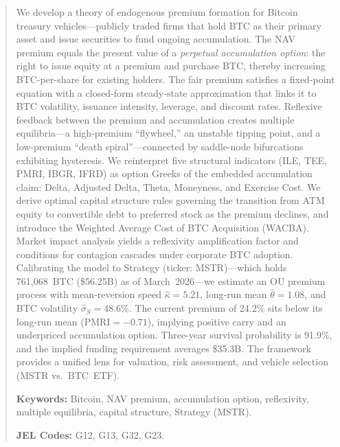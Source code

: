 
\begin{abstract}
We develop a theory of endogenous premium formation for Bitcoin treasury
vehicles---publicly traded firms that hold BTC as their primary asset and
issue securities to fund ongoing accumulation.  The NAV premium equals the
present value of a \emph{perpetual accumulation option}: the right to issue
equity at a premium and purchase BTC, thereby increasing BTC-per-share for
existing holders.  The fair premium satisfies a fixed-point equation with a
closed-form steady-state approximation that links it to BTC volatility,
issuance intensity, leverage, and discount rates.  Reflexive feedback between
the premium and accumulation creates multiple equilibria---a high-premium
``flywheel,'' an unstable tipping point, and a low-premium ``death
spiral''---connected by saddle-node bifurcations exhibiting hysteresis.  We
reinterpret five structural indicators (ILE, TEE, PMRI, IBGR, IFRD) as
option Greeks of the embedded accumulation claim: Delta, Adjusted Delta,
Theta, Moneyness, and Exercise Cost.  We derive optimal capital structure
rules governing the transition from ATM equity to convertible debt to
preferred stock as the premium declines, and introduce the Weighted Average
Cost of BTC Acquisition (WACBA).  Market impact analysis yields a reflexivity
amplification factor and conditions for contagion cascades under corporate BTC
adoption.  Calibrating the model to Strategy (ticker: MSTR)---which holds
761,068~BTC (\$56.25B) as of March~2026---we estimate an OU premium process
with mean-reversion speed $\hat\kappa = 5.21$, long-run mean
$\hat\theta = 1.08$, and BTC volatility $\hat\sigma_S = 48.6\%$.  The
current premium of 24.2\% sits below its long-run mean
($\text{PMRI} = -0.71$), implying positive carry and an underpriced
accumulation option.  Three-year survival probability is 91.9\%, and the
implied funding requirement averages \$35.3B.  The framework provides a
unified lens for valuation, risk assessment, and vehicle selection (MSTR vs.\
BTC~ETF).

\medskip
\noindent\textbf{Keywords:} Bitcoin, NAV premium, accumulation option,
reflexivity, multiple equilibria, capital structure, Strategy (MSTR).

\noindent\textbf{JEL Codes:} G12, G13, G32, G23.
\end{abstract}
